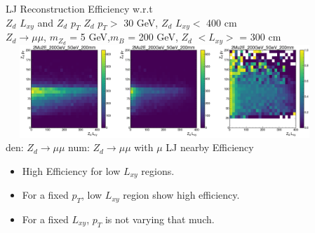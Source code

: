 \documentclass{beamer}
\begin{document}
\begin{frame}[noframenumbering,t]{LJ Reconstruction Efficiency w.r.t \\  $Z_d$ $L_{xy}$ and $Z_d$ $p_T$ }
\centering
$Z_d$ $p_T>$ 30 GeV, $Z_d$ $L_{xy}<$ 400 cm\\
\scriptsize
\textcolor{UniBlue}{$Z_d \rightarrow \mu\mu$}, \textcolor{uvaorange}{$m_{Z_d}$ = 5 GeV,$m_B$ = 200 GeV, $Z_d$ $<L_{xy}>$ = 300 cm}\\
\centering
\includegraphics[width =12cm, height =3.5cm]{zd_mumu_lxy_pt_5.png}\\
{\tiny \textcolor{uvaorange}{\hspace{-1cm}den: $Z_d\rightarrow\mu\mu$ \hspace{2.5cm } num: $Z_d\rightarrow\mu\mu$ with  $\mu$ LJ nearby\hspace{2cm} Efficiency\\}}
\normalsize
\begin{itemize}
    \item High Efficiency for low $L_{xy}$ regions.
    \item For a fixed $p_T$, low $L_{xy}$ region show high efficiency.
    \item For a fixed $L_{xy}$, $p_T$ is not varying that much.
\end{itemize}
\end{frame}
\end{document}
